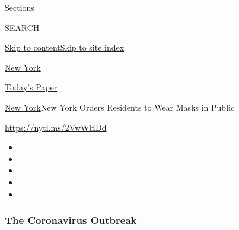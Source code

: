 Sections

SEARCH

\protect\hyperlink{site-content}{Skip to
content}\protect\hyperlink{site-index}{Skip to site index}

\href{https://www.nytimes3xbfgragh.onion/section/nyregion}{New York}

\href{https://myaccount.nytimes3xbfgragh.onion/auth/login?response_type=cookie\&client_id=vi}{}

\href{https://www.nytimes3xbfgragh.onion/section/todayspaper}{Today's
Paper}

\href{/section/nyregion}{New York}\textbar{}New York Orders Residents to
Wear Masks in Public

\url{https://nyti.ms/2VwWHDd}

\begin{itemize}
\item
\item
\item
\item
\item
\end{itemize}

\hypertarget{the-coronavirus-outbreak}{%
\subsubsection{\texorpdfstring{\href{https://www.nytimes3xbfgragh.onion/news-event/coronavirus?name=styln-coronavirus-national\&region=TOP_BANNER\&block=storyline_menu_recirc\&action=click\&pgtype=Article\&impression_id=d5808a00-f4cf-11ea-b203-1d02d46fa2b1\&variant=undefined}{The
Coronavirus
Outbreak}}{The Coronavirus Outbreak}}\label{the-coronavirus-outbreak}}

